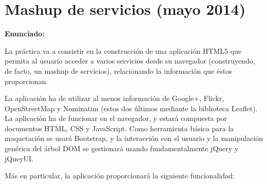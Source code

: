\section{Mashup de servicios (mayo 2014)}
\label{sec:final-14-mayo}

\textbf{Enunciado:}

La práctica va a consistir en la construcción de una aplicación HTML5 que permita al usuario acceder a varios servicios desde su navegador (construyendo, de facto, un mashup de servicios), relacionando la información que éstos proporcionan.

La aplicación ha de utilizar al menos información de Google+, Flickr, OpenStreetMap y Nominatim (estos dos últimos mediante la biblioteca Leaflet). La aplicación ha de funcionar en el navegador, y estará compuesta por documentos HTML, CSS y JavaScript. Como herramienta básica para la maquetación se usará Bootstrap, y la interacción con el usuario y la manipulación genérica del árbol DOM se gestionará usando fundamentalmente jQuery y jQueyUI.

Más en particular, la aplicación proporcionará la siguiente funcionalidad:

